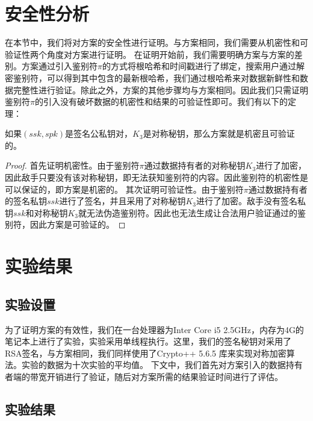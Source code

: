 \section{安全性分析}
在本节中，我们将对\multi 方案的安全性进行证明。与\single 方案相同，我们需要从机密性和可验证性两个角度对\multi 方案进行证明。
在证明开始前，我们需要明确\multi 方案与\single 方案的差别。\multi 方案通过引入鉴别符$\pi$的方式将根哈希和时间戳进行了绑定，搜索用户通过解密鉴别符，可以得到其中包含的最新根哈希，我们通过根哈希来对数据新鲜性和数据完整性进行验证。除此之外，\multi 方案的其他步骤均与\single 方案相同。因此我们只需证明鉴别符$\pi$的引入没有破坏数据的机密性和结果的可验证性即可。我们有以下的定理：
\begin{theorem}
    如果$(ssk,spk)$是签名公私钥对，$K_3$是对称秘钥，那么\multi 方案就是机密且可验证的。
\end{theorem}

\begin{proof}
    首先证明机密性。由于鉴别符$\pi$通过数据持有者的对称秘钥$K_3$进行了加密，因此敌手只要没有该对称秘钥，即无法获知鉴别符的内容。因此鉴别符的机密性是可以保证的，即\multi 方案是机密的。
    其次证明可验证性。由于鉴别符$\pi$通过数据持有者的签名私钥$ssk$进行了签名，并且采用了对称秘钥$K_3$进行了加密。敌手没有签名私钥$ssk$和对称秘钥$K_3$就无法伪造鉴别符。因此也无法生成让合法用户验证通过的鉴别符，因此\multi 方案是可验证的。
\end{proof}

\section{实验结果}
\subsection{实验设置}
为了证明\multi 方案的有效性，我们在一台处理器为Inter Core i5 2.5GHz，内存为4G的笔记本上进行了实验，实验采用单线程执行。这里，我们的签名秘钥对采用了RSA签名，与\single 方案相同，我们同样使用了Crypto++ 5.6.5 库来实现对称加密算法。实验的数据为十次实验的平均值。
下文中，我们首先对\multi 方案引入的数据持有者端的带宽开销进行了验证，随后对\multi 方案所需的结果验证时间进行了评估。
\subsection{实验结果}
\label{sec:experiments}

